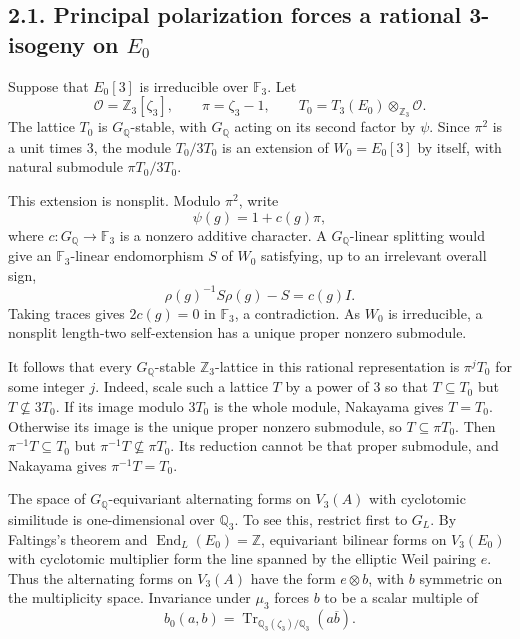 \documentclass[
  11pt,
]{article}
\begin{document}
\subsection{\texorpdfstring{2.1. Principal polarization forces a
rational 3-isogeny on
\(E_0\)}{2.1. Principal polarization forces a rational 3-isogeny on E\_0}}\label{principal-polarization-forces-a-rational-3-isogeny-on-e_0}

Suppose that \(E_0[3]\) is irreducible over \(\mathbb F_3\). Let \[
\mathcal O=\mathbb Z_3[\zeta_3],\qquad \pi=\zeta_3-1,
\qquad T_0=T_3(E_0)\otimes_{\mathbb Z_3}\mathcal O.
\] The lattice \(T_0\) is \(G_{\mathbb Q}\)-stable, with
\(G_{\mathbb Q}\) acting on its second factor by \(\psi\). Since
\(\pi^2\) is a unit times \(3\), the module \(T_0/3T_0\) is an extension
of \(W_0=E_0[3]\) by itself, with natural submodule \(\pi T_0/3T_0\).

This extension is nonsplit. Modulo \(\pi^2\), write \[
\psi(g)=1+c(g)\pi,
\] where \(c:G_{\mathbb Q}\to\mathbb F_3\) is a nonzero additive
character. A \(G_{\mathbb Q}\)-linear splitting would give an
\(\mathbb F_3\)-linear endomorphism \(S\) of \(W_0\) satisfying, up to
an irrelevant overall sign, \[
\rho(g)^{-1}S\rho(g)-S=c(g)I.
\] Taking traces gives \(2c(g)=0\) in \(\mathbb F_3\), a contradiction.
As \(W_0\) is irreducible, a nonsplit length-two self-extension has a
unique proper nonzero submodule.

It follows that every \(G_{\mathbb Q}\)-stable \(\mathbb Z_3\)-lattice
in this rational representation is \(\pi^jT_0\) for some integer \(j\).
Indeed, scale such a lattice \(T\) by a power of \(3\) so that
\(T\subseteq T_0\) but \(T\nsubseteq3T_0\). If its image modulo \(3T_0\)
is the whole module, Nakayama gives \(T=T_0\). Otherwise its image is
the unique proper nonzero submodule, so \(T\subseteq\pi T_0\). Then
\(\pi^{-1}T\subseteq T_0\) but \(\pi^{-1}T\nsubseteq\pi T_0\). Its
reduction cannot be that proper submodule, and Nakayama gives
\(\pi^{-1}T=T_0\).

The space of \(G_{\mathbb Q}\)-equivariant alternating forms on
\(V_3(A)\) with cyclotomic similitude is one-dimensional over
\(\mathbb Q_3\). To see this, restrict first to \(G_L\). By Faltings's
theorem and \(\operatorname{End}_L(E_0)=\mathbb Z\), equivariant
bilinear forms on \(V_3(E_0)\) with cyclotomic multiplier form the line
spanned by the elliptic Weil pairing \(e\). Thus the alternating forms
on \(V_3(A)\) have the form \(e\otimes b\), with \(b\) symmetric on the
multiplicity space. Invariance under \(\mu_3\) forces \(b\) to be a
scalar multiple of \[
b_0(a,b)=\operatorname{Tr}_{\mathbb Q_3(\zeta_3)/\mathbb Q_3}(a\overline b).
\]
\end{document}
